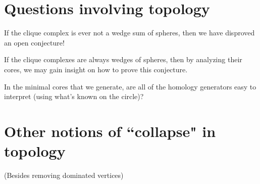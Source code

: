 \documentclass[amscd, amssymb, verbatim]{amsart}[12pt]
\theoremstyle{plain}
\theoremstyle{definition}
\begin{document}
\section{Questions involving topology}

If the clique complex is ever not a wedge sum of spheres, then we have disproved an open conjecture!

If the clique complexes are always wedges of spheres, then by analyzing their cores, we may gain insight on how to prove this conjecture.

In the minimal cores that we generate, are all of the homology generators easy to interpret (using what's known on the circle)?



\section{Other notions of ``collapse" in topology}

(Besides removing dominated vertices)






\end{document}
